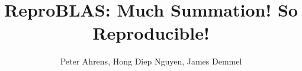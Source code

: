 \documentclass[12pt]{article}
\author{Peter Ahrens, Hong Diep Nguyen, James Demmel}
\title{ReproBLAS: Much Summation! So Reproducible!}
\theoremstyle{definition}
\numberwithin{equation}{section}
\numberwithin{figure}{section}
\begin{document}
\noindent
\maketitle
\tableofcontents
\newpage











\end{document}
